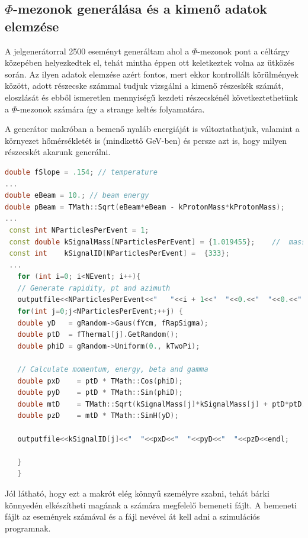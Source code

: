 \documentclass[a4paper,12pt]{article}
\begin{document}
\subsection{ $\Phi$-mezonok generálása és a kimenő adatok elemzése}
\vspace{5mm}
\par A jelgenerátorral 2500 eseményt generáltam ahol a $\Phi$-mezonok pont a céltárgy közepében helyezkedtek el, tehát mintha éppen 
ott keletkeztek volna az ütközés során. Az ilyen adatok elemzése azért fontos, mert ekkor kontrollált körülmények között, adott részecske számmal
tudjuk vizsgálni a kimenő részeskék számát, eloszlását és ebből ismeretlen mennyiségű kezdeti részecskénél következtethetünk a $\Phi$-mezonok számára
így a strange keltés folyamatára. 
\par A generátor makróban a bemenő nyaláb energiáját is változtathatjuk, valamint a környezet hőmérsékletét is (mindkettő GeV-ben) és persze
azt is, hogy milyen részecskét akarunk generálni.
\begin{lstlisting}[language=C++]
double fSlope = .154; // temperature
...
double eBeam = 10.; // beam energy
double pBeam = TMath::Sqrt(eBeam*eBeam - kProtonMass*kProtonMass);
...
 const int NParticlesPerEvent = 1;
 const double kSignalMass[NParticlesPerEvent] = {1.019455};    //  mass in GeV
 const int    kSignalID[NParticlesPerEvent] =  {333};
 ...
   for (int i=0; i<NEvent; i++){
   // Generate rapidity, pt and azimuth
   outputfile<<NParticlesPerEvent<<"   "<<i + 1<<"  "<<0.<<"  "<<0.<<"  "<<0.<<endl;
   for(int j=0;j<NParticlesPerEvent;++j) {      
   double yD   = gRandom->Gaus(fYcm, fRapSigma);
   double ptD  = fThermal[j].GetRandom();
   double phiD = gRandom->Uniform(0., kTwoPi);
   
   // Calculate momentum, energy, beta and gamma
   double pxD    = ptD * TMath::Cos(phiD);
   double pyD    = ptD * TMath::Sin(phiD);
   double mtD    = TMath::Sqrt(kSignalMass[j]*kSignalMass[j] + ptD*ptD);
   double pzD    = mtD * TMath::SinH(yD);
   
   outputfile<<kSignalID[j]<<"  "<<pxD<<"  "<<pyD<<"  "<<pzD<<endl;
   
   }
   }
\end{lstlisting}
\par Jól látható, hogy ezt a makrót elég könnyű személyre szabni, tehát bárki könnyedén elkészítheti magának a számára megfelelő
bemeneti fájlt. A bemeneti fájlt az események számával és a fájl nevével át kell adni a szimulációs programnak.
\end{document}
